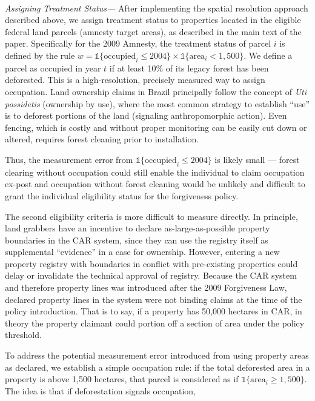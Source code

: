 \documentclass[12pt]{article}
\begin{document}
\begin{appendices}
\normalsize
\ 

\textit{Assigning Treatment Status---} After implementing the spatial resolution approach described above, we assign treatment status to properties located in the eligible federal land parcels (amnesty target areas), as described in the main text of the paper. Specifically for the 2009 Amnesty, the treatment status of parcel $i$ is defined by the rule $w=\mathbb{1}\{\text{occupied}_i\leq 2004\}\times \mathbb{1}\{\text{area}_i<1,500 \}$. We define a parcel as occupied in year $t$ if at least 10\% of its legacy forest has been deforested. This is a high-resolution, precisely measured way to assign occupation. Land ownership claims in Brazil principally follow the concept of \textit{Uti possidetis} (ownership by use), where the most common strategy to establish ``use'' is to deforest portions of the land (signaling anthropomorphic action). Even fencing, which is costly and without proper monitoring can be easily cut down or altered, requires forest cleaning prior to installation. 
\

\quad Thus, the measurement error from $\mathbb{1}\{\text{occupied}_i\leq 2004\}$ is likely small --- forest clearing without occupation could still enable the individual to claim occupation ex-post and occupation without forest cleaning would be unlikely and difficult to grant the individual eligibility status for the forgiveness policy.
\

\quad The second eligibility criteria is more difficult to measure directly. In principle, land grabbers have an incentive to declare as-large-as-possible property boundaries in the CAR system, since they can use the registry itself as supplemental ``evidence'' in a case for ownership. However, entering a new property registry with boundaries in conflict with pre-existing properties could delay or invalidate the technical approval of registry. Because the CAR system and therefore property lines was introduced after the 2009 Forgiveness Law, declared property lines in the system were not binding claims at the time of the policy introduction. That is to say, if a property has 50,000 hectares in CAR, in theory the property claimant could portion off a section of area under the policy threshold.
\

\quad To address the potential measurement error introduced from using property areas as declared, we establish a simple occupation rule: if the total deforested area in a property is above 1,500 hectares, that parcel is considered as if $\mathbb{1}\{\text{area}_i\geq1,500 \}$. The idea is that if deforestation signals occupation, 


\end{appendices}
\end{document}
